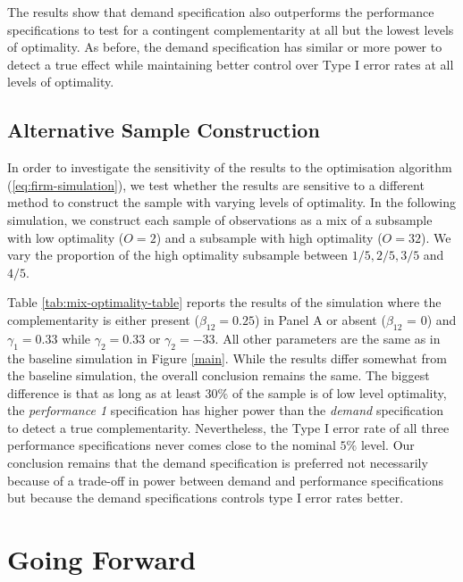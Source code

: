 \documentclass[12pt]{article}
\begin{document}
The results show that demand specification also outperforms the performance specifications to test for a contingent complementarity at all but the lowest levels of optimality. As before, the demand specification has similar or more power to detect a true effect while maintaining better control over Type I error rates at all levels of optimality.

\subsection{Alternative Sample Construction}

In order to investigate the sensitivity of the results to the optimisation algorithm (\ref{eq:firm-simulation}), we test whether the results are sensitive to a different method to construct the sample with varying levels of optimality. In the following simulation, we construct each sample of observations as a mix of a subsample with low optimality ($O = 2$) and a subsample with high optimality ($O = 32$). We vary the proportion of the high optimality subsample between $1/5, 2/5, 3/5$ and $4/5$. 



Table \ref{tab:mix-optimality-table} reports the results of the simulation where the complementarity is either present ($\beta_{12} = 0.25$) in Panel A or absent ($\beta_{12}$ = 0) and $\gamma_1 = 0.33$ while $\gamma_2 = 0.33$ or $\gamma_2 = -33$. All other parameters are the same as in the baseline simulation in Figure \ref{main}. While the results differ somewhat from the baseline simulation, the overall conclusion remains the same. The biggest difference is that as long as at least $30\%$ of the sample is of low level optimality, the \emph{performance 1} specification has higher power than the \emph{demand} specification to detect a true complementarity. Nevertheless, the Type I error rate of all three performance specifications never comes close to the nominal $5\%$ level. Our conclusion remains that the demand specification is preferred not necessarily because of a trade-off in power between demand and performance specifications but because the demand specifications controls type I error rates better.


\section{Going Forward}
\end{document}
